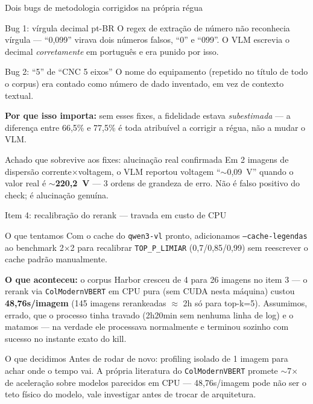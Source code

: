 \documentclass{beamer}
\newenvironment{numerobloco}[1]{\begin{block}{#1}}{\end{block}}
\newenvironment{decisaobloco}[1]{\begin{alertblock}{#1}}{\end{alertblock}}
\begin{document}
\begin{frame}{Dois bugs de metodologia corrigidos na própria régua}
  \footnotesize
  \begin{numerobloco}{Bug 1: vírgula decimal pt-BR}
    O regex de extração de número não reconhecia vírgula — ``0,099'' virava dois
    números falsos, ``0'' e ``099''. O VLM escrevia o decimal \emph{corretamente} em
    português e era punido por isso.
  \end{numerobloco}
  \begin{numerobloco}{Bug 2: ``5'' de ``CNC 5 eixos''}
    O nome do equipamento (repetido no título de todo o corpus) era contado como
    número de dado inventado, em vez de contexto textual.
  \end{numerobloco}

  \pause
  \textbf{Por que isso importa:} sem esses fixes, a fidelidade estava
  \emph{subestimada} — a diferença entre 66,5\% e 77,5\% é toda atribuível a corrigir
  a régua, não a mudar o VLM.

  \pause
  \begin{decisaobloco}{Achado que sobrevive aos fixes: alucinação real confirmada}
    Em 2 imagens de dispersão corrente$\times$voltagem, o VLM reportou voltagem
    ``$\sim$0,09~V'' quando o valor real é \textbf{$\sim$220,2~V} — 3 ordens de
    grandeza de erro. Não é falso positivo do check; é alucinação genuína.
  \end{decisaobloco}
\end{frame}

\begin{frame}{Item 4: recalibração do rerank — travada em custo de CPU}
  \small
  \begin{numerobloco}{O que tentamos}
    Com o cache do \texttt{qwen3-vl} pronto, adicionamos \texttt{--cache-legendas} ao
    benchmark 2$\times$2 para recalibrar \texttt{TOP\_P\_LIMIAR} (0,7/0,85/0,99) sem
    reescrever o cache padrão manualmente.
  \end{numerobloco}

  \pause
  \textbf{O que aconteceu:} o corpus Harbor cresceu de 4 para 26 imagens no item 3 —
  o rerank via \texttt{ColModernVBERT} em CPU pura (sem CUDA nesta máquina) custou
  \textbf{48,76s/imagem} (145 imagens rerankeadas $\approx$ 2h só para top-k=5).
  Assumimos, errado, que o processo tinha travado (2h20min sem nenhuma linha de log) e
  o matamos — na verdade ele processava normalmente e terminou sozinho com sucesso no
  instante exato do kill.

  \pause
  \begin{decisaobloco}{O que decidimos}
    Antes de rodar de novo: profiling isolado de 1 imagem para achar onde o tempo vai.
    A própria literatura do \texttt{ColModernVBERT} promete $\sim$7$\times$ de
    aceleração sobre modelos parecidos em CPU — 48,76s/imagem pode não ser o teto
    físico do modelo, vale investigar antes de trocar de arquitetura.
  \end{decisaobloco}
\end{frame}
\end{document}
